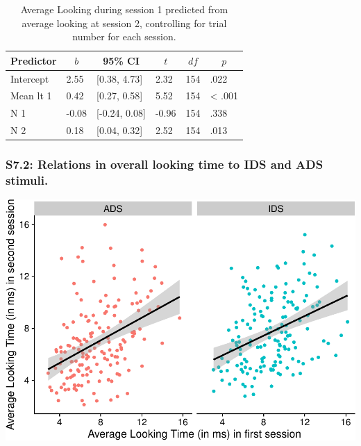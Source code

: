 \documentclass[
  man, donotrepeattitle,floatsintext]{apa6}
\begin{document}
\begin{table}[tbp]

\begin{center}
\begin{threeparttable}

\caption{\label{tab:unnamed-chunk-9}Average Looking during session 1 predicted from average looking at session 2, controlling for trial number for each session.}

\begin{tabular}{llllll}
\toprule
Predictor & \multicolumn{1}{c}{$b$} & \multicolumn{1}{c}{95\% CI} & \multicolumn{1}{c}{$t$} & \multicolumn{1}{c}{$\mathit{df}$} & \multicolumn{1}{c}{$p$}\\
\midrule
Intercept & 2.55 & {}[0.38, 4.73] & 2.32 & 154 & .022\\
Mean lt 1 & 0.42 & {}[0.27, 0.58] & 5.52 & 154 & < .001\\
N 1 & -0.08 & {}[-0.24, 0.08] & -0.96 & 154 & .338\\
N 2 & 0.18 & {}[0.04, 0.32] & 2.52 & 154 & .013\\
\bottomrule
\end{tabular}

\end{threeparttable}
\end{center}

\end{table}

\hypertarget{s7.2-relations-in-overall-looking-time-to-ids-and-ads-stimuli.}{%
\subsubsection{S7.2: Relations in overall looking time to IDS and ADS stimuli.}\label{s7.2-relations-in-overall-looking-time-to-ids-and-ads-stimuli.}}

\includegraphics{MB1T_supplement_files/figure-latex/unnamed-chunk-10-1.pdf}
\end{document}
